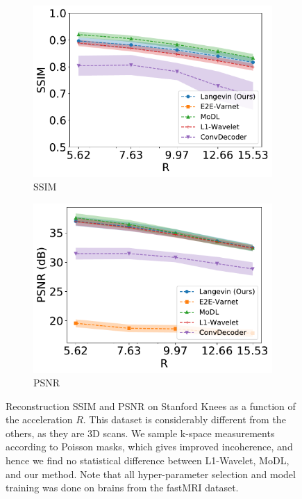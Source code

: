 \documentclass{article}
\begin{document}
\begin{figure}
    \centering
    \begin{subfigure}{0.48\columnwidth}
    \centering
    \includegraphics[width=\columnwidth]{stanford-poisson-ssim.pdf}
    \caption{SSIM}
    \label{fig:stanford-ssim}
    \end{subfigure}
    \hfill
    \begin{subfigure}{0.48\columnwidth}
    \centering
    \includegraphics[width=\columnwidth]{stanford-poisson-psnr.pdf}
    \caption{PSNR}
    \label{fig:stanford-psnr}
    \end{subfigure}
    \caption{Reconstruction SSIM and PSNR on Stanford Knees as a function of the acceleration $R$. This dataset is considerably different from the others, as they are 3D scans. We sample k-space measurements according to Poisson masks, which gives improved incoherence, and hence we find no statistical difference between L1-Wavelet, MoDL, and our method. Note that all hyper-parameter selection and model training was done on brains from the fastMRI dataset.}
    \label{fig:stanford-psnr-ssim}
\end{figure}
\end{document}
